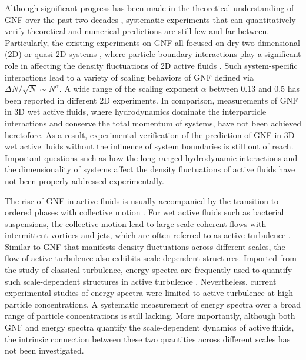 \documentclass[twocolumn,aps,prx,amsmath,amssymb,longbibliography]{revtex4-2}
\begin{document}
Although significant progress has been made in the theoretical understanding of GNF over the past two decades \cite{Toner1995, Tu1998, Toner1998, AditiSimha2002, Ramaswamy2003, Toner2005, Chate2008, Mishra2010, Dey2012, Saintillan2012, Saintillan2013, Ngo2014,  Mahault2019}, systematic experiments that can quantitatively verify theoretical and numerical predictions are still few and far between. Particularly, the existing experiments on GNF all focused on dry two-dimensional (2D) or quasi-2D systems \cite{Narayan2007, Aranson2008, Kudrolli2008, Deseigne2010, Zhang2010, Schaller2013, Nishiguchi2017, Kawaguchi2017, Palacci2013}, where particle-boundary interactions play a significant role in affecting the density fluctuations of 2D active fluids \cite{Marchetti2013}. Such system-specific interactions lead to a variety of scaling behaviors of GNF defined via $\Delta N/\sqrt N \sim N^\alpha$. A wide range of the scaling exponent $\alpha$ between 0.13 and 0.5 has been reported in different 2D experiments. In comparison, measurements of GNF in 3D wet active fluids, where hydrodynamics dominate the interparticle interactions and conserve the total momentum of systems, have not been achieved heretofore. As a result, experimental verification of the prediction of GNF in 3D wet active fluids without the influence of system boundaries is still out of reach. Important questions such as how the long-ranged hydrodynamic interactions and the dimensionality of systems affect the density fluctuations of active fluids have not been properly addressed experimentally.

The rise of GNF in active fluids is usually accompanied by the transition to ordered phases with collective motion \cite{Ramaswamy2010,Marchetti2013}. For wet active fluids such as bacterial suspensions, the collective motion lead to large-scale coherent flows with intermittent vortices and jets, which are often referred to as active turbulence \cite{Wolgemuth2008,Wensink2012,Dunkel2013a,Bratanov2015,Guo2018,Linkmann2019,Bardfalvy2019,Alert2020,Skultety2020,Peng2020}. Similar to GNF that manifests density fluctuations across different scales, the flow of active turbulence also exhibits scale-dependent structures. Imported from the study of classical turbulence, energy spectra are frequently used to quantify such scale-dependent structures in active turbulence \cite{Ishikawa2011,Wensink2012,Dunkel2013a,Giomi2015,Creppy2015,Patteson2018,Alert2020}. Nevertheless, current experimental studies of energy spectra were limited to active turbulence at high particle concentrations. A systematic measurement of energy spectra over a broad range of particle concentrations is still lacking. More importantly, although both GNF and energy spectra quantify the scale-dependent dynamics of active fluids, the intrinsic connection between these two quantities across different scales has not been investigated.
\end{document}
